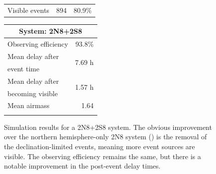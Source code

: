 \begin{colsection}
\begin{figure}[p]
\begin{center}
\begin{minipage}[t]{0.45\linewidth}
\begin{tabular}{lrr}
                \midrule
                Visible events & 894 &  80.9\% \\
            \end{tabular}
        \end{minipage}
        \begin{minipage}[t]{0.37\linewidth}\vspace{0pt}
            \begin{tabular}{lr}
                \multicolumn{2}{c}{\textbf{System: 2N8+2S8}} \\
                \midrule
                Observing efficiency & 93.8\% \\
                \midrule
                Mean delay after     & \multirow{2}{*}{7.69 h} \\
                event time           & \\
                Mean delay after     & \multirow{2}{*}{1.57 h} \\
                becoming visible     & \\
                \midrule
                Mean airmass         & 1.64 \\
                & \\
            \end{tabular}
        \end{minipage}
    \end{center}
    \caption[GW simulation results: 2N8+2S8 system]{
        Simulation results for a 2N8+2S8 system. The obvious improvement over the northern hemisphere-only 2N8 system () is the removal of the declination-limited events, meaning more event sources are visible. The observing efficiency remains the same, but there is a notable improvement in the post-event delay times.
    }\label{fig:gw_sim_2n8+2s8}
\end{figure}


\end{colsection}
